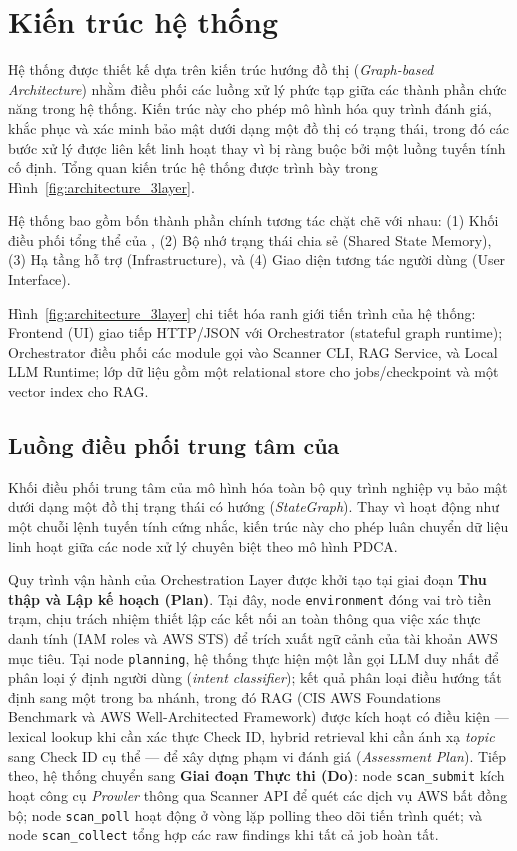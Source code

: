 \section{Kiến trúc hệ thống}
\label{sec:system_architecture}

Hệ thống được thiết kế dựa trên kiến trúc hướng đồ thị
(\textit{Graph-based Architecture})
nhằm điều phối các luồng xử lý phức tạp
giữa các thành phần chức năng trong hệ thống.
Kiến trúc này cho phép mô hình hóa quy trình đánh giá,
khắc phục và xác minh bảo mật dưới dạng một đồ thị có trạng thái,
trong đó các bước xử lý được liên kết linh hoạt
thay vì bị ràng buộc bởi một luồng tuyến tính cố định.
Tổng quan kiến trúc hệ thống được trình bày trong Hình~\ref{fig:architecture_3layer}.

Hệ thống bao gồm bốn thành phần chính tương tác chặt chẽ với nhau: (1) Khối điều phối tổng thể của \sysnameshort{}, (2) Bộ nhớ trạng thái chia sẻ (Shared State Memory), (3) Hạ tầng hỗ trợ (Infrastructure), và (4) Giao diện tương tác người dùng (User Interface).



Hình~\ref{fig:architecture_3layer} chi tiết hóa ranh giới tiến trình của hệ thống: Frontend (UI) giao tiếp HTTP/JSON với Orchestrator (stateful graph runtime); Orchestrator điều phối các module gọi vào Scanner CLI, RAG Service, và Local LLM Runtime; lớp dữ liệu gồm một relational store cho jobs/checkpoint và một vector index cho RAG.

\subsection{Luồng điều phối trung tâm của \sysnameshort{}}
Khối điều phối trung tâm của \sysname{} mô hình hóa toàn bộ quy trình nghiệp vụ bảo mật dưới dạng một đồ thị trạng thái có hướng (\textit{StateGraph}). Thay vì hoạt động như một chuỗi lệnh tuyến tính cứng nhắc, kiến trúc này cho phép luân chuyển dữ liệu linh hoạt giữa các node xử lý chuyên biệt theo mô hình PDCA.

Quy trình vận hành của Orchestration Layer được khởi tạo tại giai đoạn \textbf{Thu thập và Lập kế hoạch (Plan)}. Tại đây, node \texttt{environment} đóng vai trò tiền trạm, chịu trách nhiệm thiết lập các kết nối an toàn thông qua việc xác thực danh tính (IAM roles và AWS STS) để trích xuất ngữ cảnh của tài khoản AWS mục tiêu. Tại node \texttt{planning}, hệ thống thực hiện một lần gọi LLM duy nhất để phân loại ý định người dùng (\textit{intent classifier}); kết quả phân loại điều hướng tất định sang một trong ba nhánh, trong đó RAG (CIS AWS Foundations Benchmark và AWS Well-Architected Framework) được kích hoạt có điều kiện --- lexical lookup khi cần xác thực Check ID, hybrid retrieval khi cần ánh xạ \textit{topic} sang Check ID cụ thể --- để xây dựng phạm vi đánh giá (\textit{Assessment Plan}). Tiếp theo, hệ thống chuyển sang \textbf{Giai đoạn Thực thi (Do)}: node \texttt{scan\_submit} kích hoạt công cụ \textit{Prowler} thông qua Scanner API để quét các dịch vụ AWS bất đồng bộ; node \texttt{scan\_poll} hoạt động ở vòng lặp polling theo dõi tiến trình quét; và node \texttt{scan\_collect} tổng hợp các raw findings khi tất cả job hoàn tất.

